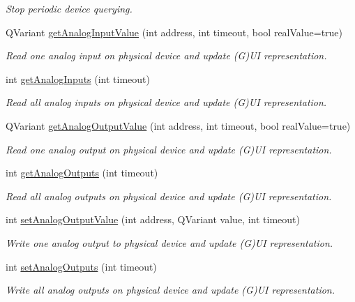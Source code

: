 \begin{DoxyCompactItemize}
\begin{DoxyCompactList}\small\item\em Stop periodic device querying. \end{DoxyCompactList}\item 
QVariant \hyperlink{classmdt_device_a7ff556995f38d2098eda3cf80685b542}{getAnalogInputValue} (int address, int timeout, bool realValue=true)
\begin{DoxyCompactList}\small\item\em Read one analog input on physical device and update (G)UI representation. \end{DoxyCompactList}\item 
int \hyperlink{classmdt_device_a585cc32f6aac4d5788928ecf1fdacf51}{getAnalogInputs} (int timeout)
\begin{DoxyCompactList}\small\item\em Read all analog inputs on physical device and update (G)UI representation. \end{DoxyCompactList}\item 
QVariant \hyperlink{classmdt_device_a7085491cf2d96fd2afd3004de6caef0d}{getAnalogOutputValue} (int address, int timeout, bool realValue=true)
\begin{DoxyCompactList}\small\item\em Read one analog output on physical device and update (G)UI representation. \end{DoxyCompactList}\item 
int \hyperlink{classmdt_device_a12f717202e9860d0c24b9dff8d672ef8}{getAnalogOutputs} (int timeout)
\begin{DoxyCompactList}\small\item\em Read all analog outputs on physical device and update (G)UI representation. \end{DoxyCompactList}\item 
int \hyperlink{classmdt_device_a4b01925cfbbb62e32a3e85a9c4b1538a}{setAnalogOutputValue} (int address, QVariant value, int timeout)
\begin{DoxyCompactList}\small\item\em Write one analog output to physical device and update (G)UI representation. \end{DoxyCompactList}\item 
int \hyperlink{classmdt_device_ae45c39c2ef38b5952171fdc1c3284748}{setAnalogOutputs} (int timeout)
\begin{DoxyCompactList}\small\item\em Write all analog outputs on physical device and update (G)UI representation. \end{DoxyCompactList}\item 

\end{DoxyCompactItemize}
